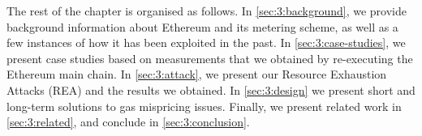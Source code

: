  The rest of the chapter is organised as follows.
In \autoref{sec:3:background}, we provide background information about Ethereum and its metering scheme, as well as a few instances of how it has been exploited in the past.
In \autoref{sec:3:case-studies}, we present case studies based on measurements that we obtained by re-executing the Ethereum main chain.
In \autoref{sec:3:attack}, we present our Resource Exhaustion Attacks (REA) and the results we obtained. In \autoref{sec:3:design} we present short and long-term solutions to gas mispricing issues.
Finally, we present related work in \autoref{sec:3:related}, and conclude in \autoref{sec:3:conclusion}.
